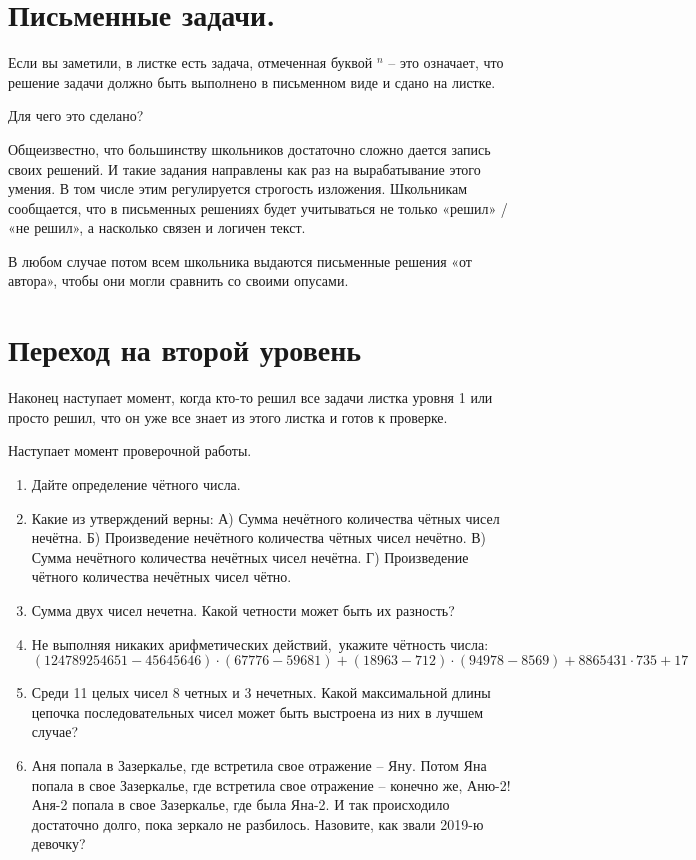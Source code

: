 \section{ Письменные задачи.}
Если вы заметили, в листке есть задача, отмеченная буквой ${}^{n}$ -- это означает, что решение задачи должно быть выполнено в письменном виде и сдано на листке.

Для чего это сделано?

Общеизвестно, что большинству школьников достаточно сложно дается запись своих решений. И такие задания направлены как раз на вырабатывание этого умения. В том числе этим регулируется строгость изложения. Школьникам сообщается, что в письменных решениях будет учитываться не только «решил» / «не решил», а насколько связен и логичен текст. 

В любом случае потом всем школьника выдаются письменные решения «от автора», чтобы они могли сравнить со своими опусами.


\section{ Переход на второй уровень}

Наконец наступает момент, когда кто-то решил все задачи листка уровня 1 или просто решил, что он уже все знает из этого листка и готов к проверке.

Наступает момент проверочной работы.


\begin{enumerate}
	\item Дайте определение чётного числа.
	
	\item Какие из утверждений верны: А) Сумма нечётного количества чётных чисел нечётна. Б) Произведение нечётного количества чётных чисел нечётно. В) Сумма нечётного количества нечётных чисел нечётна. Г) Произведение чётного количества нечётных чисел чётно.
	
	\item Сумма двух чисел нечетна. Какой четности может быть их разность?
	
	\item Не выполняя никаких арифметических действий,~укажите чётность числа: 
	\[(124789254651-45645646)\cdot(67776-59681)+(18963-712)\cdot(94978-8569)+8865431\cdot735+17\] 
	\item Среди 11 целых чисел 8 четных и 3 нечетных. Какой максимальной длины цепочка последовательных чисел может быть выстроена из них в лучшем случае? 
	\item  Аня попала в Зазеркалье, где встретила свое отражение -- Яну. Потом Яна попала в свое Зазеркалье, где встретила свое отражение -- конечно же, Аню-2! Аня-2 попала в свое Зазеркалье, где была Яна-2. И так происходило достаточно долго, пока зеркало не разбилось. Назовите, как звали 2019-ю девочку?
\end{enumerate}
\hrulefill

